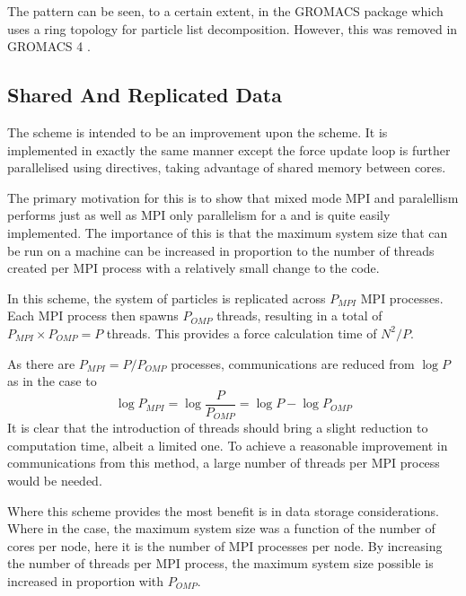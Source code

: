 The \systolicloop{} pattern can be seen, to a certain extent, in the
GROMACS \cite{berendsen1995gromacs} package which uses a ring
topology for particle list decomposition.
%
However, this was removed in GROMACS 4 \cite{hess2008gromacs}.



\subsection{Shared And Replicated Data}

The \sharedandreplicateddata{} scheme is intended to be an improvement
upon the \replicateddata{} scheme.
It is implemented in exactly the same
manner except the force update loop is further
parallelised using \openmp{} directives, taking advantage of shared
memory between cores.

The primary motivation for this is to show that mixed mode MPI and \openmp{}
paralellism performs just as well as MPI only parallelism for a
\replicateddata{} and is quite easily implemented.
%
The importance of this is that the maximum system size that can
be run on a machine
can be increased in proportion to the number of \openmp{} threads
created per MPI process with a relatively small change to the code.

In this scheme, the system of particles is replicated across
$P_{MPI}$ MPI processes.
%
Each MPI process then spawns $P_{OMP}$ threads, resulting in a total
of $P_{MPI}\times{}P_{OMP} = P$ threads.
%
This provides a force calculation time of $N^2/P$.

As there are $P_{MPI} = P/P_{OMP}$ processes, communications are
reduced from $\log{P}$ as in the \replicateddata{} case to
\begin{equation}
    \log{P_{MPI}} = \log{\frac{P}{P_{OMP}}} = \log{P} - \log{P_{OMP}}
\end{equation}
%
It is clear that the introduction of \openmp{} threads should
bring a slight reduction to computation time, albeit a limited one.
%
To achieve a reasonable improvement in communications from this method,
a large number of \openmp{} threads per MPI process would be needed.

Where this scheme provides the most benefit is in data storage considerations.
%
Where in the \replicateddata{} case, the maximum system size was a function
of the number of cores per node, here it is the number of MPI processes
per node.
%
By increasing the number of \openmp{} threads per MPI process,
the maximum system size possible is increased
in proportion with $P_{OMP}$.


